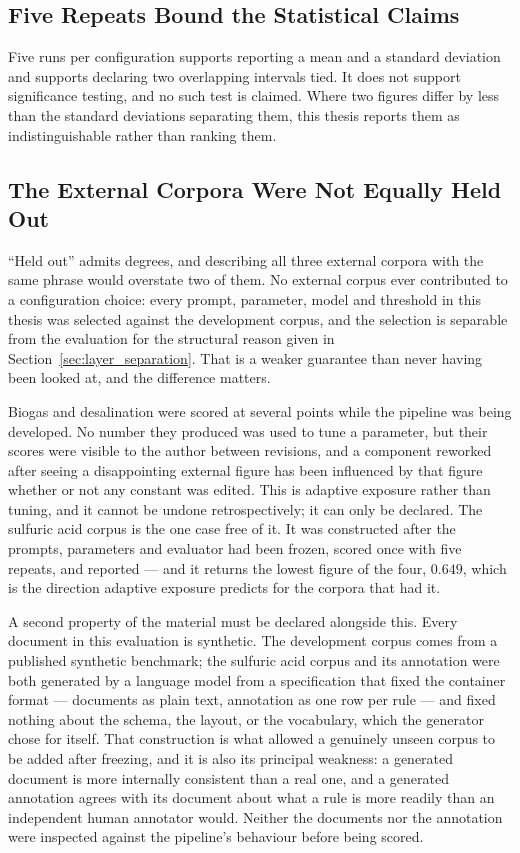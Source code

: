 \documentclass[11pt]{article}
\begin{document}
\subsection{Five Repeats Bound the Statistical Claims}
\label{sec:lim_repeats}
Five runs per configuration supports reporting a mean and a standard deviation
and supports declaring two overlapping intervals tied. It does not support
significance testing, and no such test is claimed. Where two figures differ by
less than the standard deviations separating them, this thesis reports them as
indistinguishable rather than ranking them.

\subsection{The External Corpora Were Not Equally Held Out}
\label{sec:lim_exposure}
``Held out'' admits degrees, and describing all three external corpora with the
same phrase would overstate two of them. No external corpus ever contributed to
a configuration choice: every prompt, parameter, model and threshold in this
thesis was selected against the development corpus, and the selection is
separable from the evaluation for the structural reason given in
Section~\ref{sec:layer_separation}. That is a weaker guarantee than never having
been looked at, and the difference matters.

Biogas and desalination were scored at several points while the pipeline was
being developed. No number they produced was used to tune a parameter, but their
scores were visible to the author between revisions, and a component reworked
after seeing a disappointing external figure has been influenced by that figure
whether or not any constant was edited. This is adaptive exposure rather than
tuning, and it cannot be undone retrospectively; it can only be declared. The
sulfuric acid corpus is the one case free of it. It was constructed after the
prompts, parameters and evaluator had been frozen, scored once with five repeats,
and reported --- and it returns the lowest figure of the four, $0.649$, which is
the direction adaptive exposure predicts for the corpora that had it.

A second property of the material must be declared alongside this. Every
document in this evaluation is synthetic. The development corpus comes from a
published synthetic benchmark; the sulfuric acid corpus and its annotation were
both generated by a language model from a specification that fixed the container
format --- documents as plain text, annotation as one row per rule --- and fixed
nothing about the schema, the layout, or the vocabulary, which the generator
chose for itself. That construction is what allowed a genuinely unseen corpus to
be added after freezing, and it is also its principal weakness: a generated
document is more internally consistent than a real one, and a generated
annotation agrees with its document about what a rule is more readily than an
independent human annotator would. Neither the documents nor the annotation were
inspected against the pipeline's behaviour before being scored.
\end{document}
